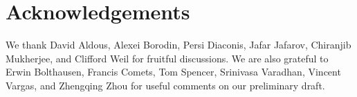 \documentclass[11pt,reqno]{amsart}
\numberwithin{equation}{section}
\theoremstyle{definition}
\begin{document}
\section*{Acknowledgements}
We thank David Aldous, Alexei Borodin, Persi Diaconis, Jafar Jafarov, Chiranjib Mukherjee, and Clifford Weil for fruitful discussions.
We are also grateful to  Erwin Bolthausen, Francis Comets, Tom Spencer, Srinivasa Varadhan, Vincent Vargas, and Zhengqing Zhou for useful comments on our preliminary draft.


\end{document}
